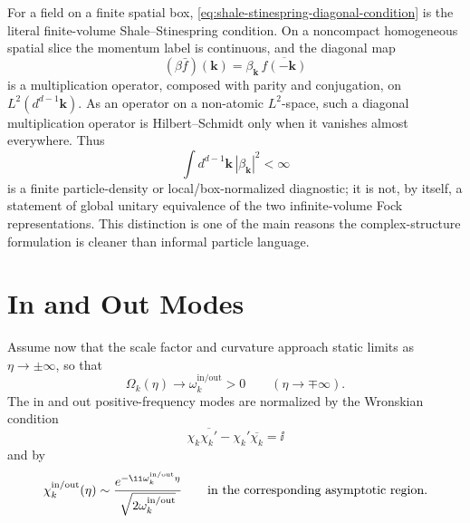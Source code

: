 For a field on a finite spatial box, \eqref{eq:shale-stinespring-diagonal-condition}
is the literal finite-volume Shale--Stinespring condition.  On a noncompact
homogeneous spatial slice the momentum label is continuous, and the diagonal
map
\[
  (\beta \bar f)(\mathbf k)=\beta_{\mathbf k}\,\overline{f(-\mathbf k)}
\]
is a multiplication operator, composed with parity and conjugation, on
\(L^2(d^{d-1}\mathbf k)\).  As an operator on a non-atomic \(L^2\)-space,
such a diagonal multiplication operator is Hilbert--Schmidt only when it
vanishes almost everywhere.  Thus
\[
  \int d^{d-1}\mathbf k\,|\beta_{\mathbf k}|^2<\infty
\]
is a finite particle-density or local/box-normalized diagnostic; it is not,
by itself, a statement of global unitary equivalence of the two infinite-volume
Fock representations.  This distinction is one of the main reasons the
complex-structure formulation is cleaner than informal particle language.

\section{In and Out Modes}

Assume now that the scale factor and curvature approach static limits as
\(\eta\to\pm\infty\), so that
\begin{equation}
  \Omega_k(\eta)\longrightarrow
  \omega_k^{\mathrm{in/out}}>0
  \qquad
  (\eta\to\mp\infty).
  \label{eq:in-out-frequency-limits}
\end{equation}
The in and out positive-frequency modes are normalized by the Wronskian
condition
\begin{equation}
  \chi_k\overline{\chi_k'}-\chi_k'\overline{\chi_k}=\ii
  \label{eq:mode-wronskian-normalization}
\end{equation}
and by
\begin{equation}
  \chi_k^{\mathrm{in/out}}(\eta)
  \sim
  \frac{e^{-\ii\omega_k^{\mathrm{in/out}}\eta}}
       {\sqrt{2\omega_k^{\mathrm{in/out}}}}
  \qquad
  \hbox{in the corresponding asymptotic region.}
  \label{eq:in-out-positive-frequency-asymptotics}
\end{equation}


